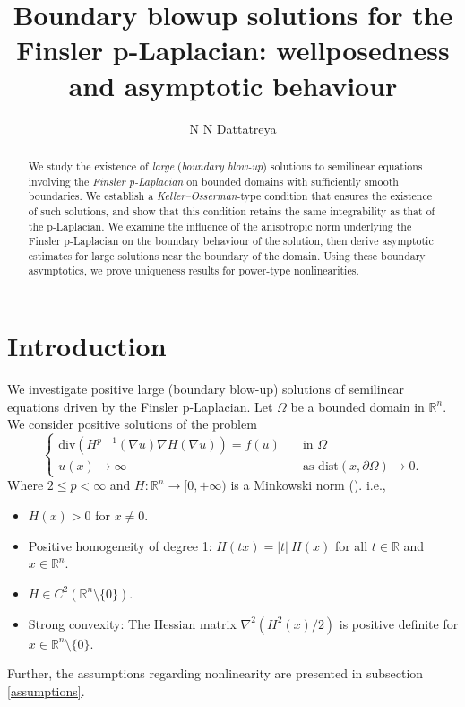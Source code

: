 \documentclass[11pt]{amsart}
\title[Boundary blowup solutions of Finsler p-Laplacian on bounded domains]{Boundary blowup solutions for the Finsler p-Laplacian: wellposedness and asymptotic behaviour}
\author[N N Dattatreya]{N N Dattatreya}
\date{}
\newcommand{\rn}{\mathbb{R}^{n}}
\newcommand{\R}{\mathbb{R}}
\numberwithin{equation}{section}
\begin{document}
\begin{abstract}
  We study the existence of \textit{large} (\textit{boundary blow-up}) solutions to semilinear equations involving the \textit{Finsler p-Laplacian} on bounded domains with sufficiently smooth boundaries. We establish a \textit{Keller–Osserman}-type condition that ensures the existence of such solutions, and show that this condition retains the same integrability as that of the p-Laplacian. We examine the influence of the anisotropic norm underlying the Finsler p-Laplacian on the boundary behaviour of the solution, then derive asymptotic estimates for large solutions near the boundary of the domain. Using these boundary asymptotics, we prove uniqueness results for power-type nonlinearities. 
\end{abstract}
\subjclass{35J , 35B44 , 35B40 ,34A12 , 35A02 , 35A01 . 
}
\maketitle
\section{Introduction}
We investigate positive large (boundary blow-up) solutions of semilinear equations driven by the Finsler p-Laplacian. Let $\Omega$ be a bounded domain in $\rn$. We consider positive solutions of the problem
\begin{equation}\label{finsler large eqn}
    \begin{cases}
        \text{div}\left(H^{p-1}(\nabla u)\nabla H(\nabla u)\right)=f(u)\quad &\text{in }\Omega\\
        u(x)\to\infty &\text{as dist}(x,\partial\Omega)\to 0.
    \end{cases}
\end{equation}
Where $2\leq p<\infty$ and $H\colon\R^n\rightarrow[0,+\infty)$ is a Minkowski norm (\cite{Shenbook2001}). i.e.,
\begin{itemize}
\item $H(x)>0$ for $x\ne 0$.
\item Positive homogeneity of degree 1: $H\left(tx\right)=|t|~H\left(x\right)$ for all $t\in \R$ and $x\in \R^{n}$.
    \item $H\in C^{2}\left(\R^n\setminus \{0\}\right)$.
     \item Strong convexity: The Hessian matrix $\nabla^{2}(H^{2}(x)/2)$ is positive definite for $x\in \rn\setminus\{0\}$.
    \end{itemize}
Further, the assumptions regarding nonlinearity are presented in subsection \ref{assumptions}.
\end{document}
